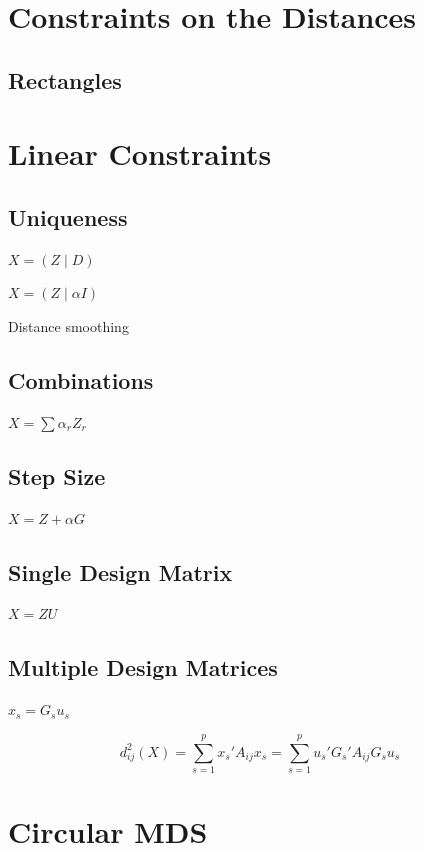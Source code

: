 \documentclass[
  12pt,
  letterpaper,
  DIV=11,
  numbers=noendperiod]{scrreprt}
\theoremstyle{remark}
\begin{document}
\section{Constraints on the
Distances}\label{constraints-on-the-distances}

\subsection{Rectangles}\label{rectangles}

\section{Linear Constraints}\label{lincons}

\subsection{Uniqueness}\label{uniqueness}

\(X=(Z\mid D)\)

\(X=(Z\mid \alpha I)\)

Distance smoothing

\subsection{Combinations}\label{combinations}

\(X=\sum\alpha_r Z_r\)

\subsection{Step Size}\label{stepsize}

\(X=Z+\alpha G\)

\subsection{Single Design Matrix}\label{singdesign}

\(X=ZU\)

\subsection{Multiple Design Matrices}\label{multdesign}

\(x_s=G_su_s\)

\[
d_{ij}^2(X)=\sum_{s=1}^p x_s'A_{ij}x_s=
\sum_{s=1}^p u_s'G_s'A_{ij}G_su_s
\]

\section{Circular MDS}\label{circmds}
\end{document}
